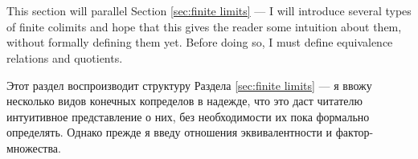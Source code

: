 \documentclass[CT4S-EN-RU]{subfiles}
\begin{document}
\section{}\label{sec:finite colimits}

\begin{blockENG}
This section will parallel Section \ref{sec:finite limits} — I will introduce several types of finite colimits and hope that this gives the reader some intuition about them, without formally defining them yet. Before doing so, I must define equivalence relations and quotients.
\end{blockENG}

\begin{blockRUS}
Этот раздел воспроизводит структуру Раздела \ref{sec:finite limits} — я ввожу несколько видов конечных копределов в надежде, что это даст читателю интуитивное представление о них, без необходимости их пока формально определять. Однако прежде я введу отношения эквивалентности и фактор-множества.
\end{blockRUS}


\subsection{}
\end{document}
